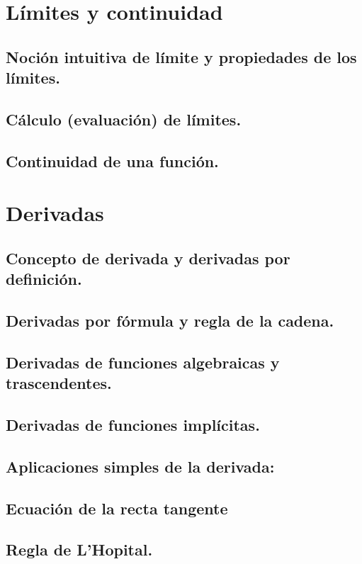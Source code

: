 \section{Límites y continuidad} %


\subsection{Noción intuitiva de límite y propiedades de los límites.}
\subsection{Cálculo (evaluación) de límites.}
\subsection{Continuidad de una función.}





\section{Derivadas} %
\subsection{Concepto de derivada y derivadas por definición.}
\subsection{Derivadas por fórmula y regla de la cadena.}
\subsection{Derivadas de funciones algebraicas y trascendentes.}
\subsection{Derivadas de funciones implícitas.}
\subsection{Aplicaciones simples de la derivada:}
\subsection{Ecuación de la recta tangente}
\subsection{Regla de L'Hopital.}
